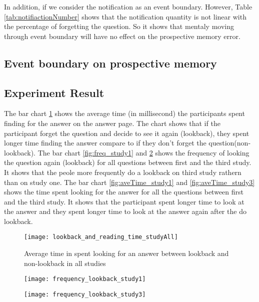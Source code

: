 In addition, if we consider the notification as an event boundary. However, Table \ref{tab:notifiactionNumber} shows
that the notification quantity is not linear with the percentage of forgetting the question.
So it shows that mentaly moving through event boundary will have no effect on the prospective memory error.

\subsection{Event boundary on prospective memory}
\subsection{Experiment Result}
The bar chart \ref{fig:lookingAnswer_lookback} shows the average time (in millisecond) the participants spent finding for the answer on the answer page.
The chart shows that if the participant forget the question and decide to see it again (lookback), they spent longer time finding the answer compare to if they don't forget the question(non-lookback).
The bar chart \ref{fig:freq_study1} and \ref{fig:freq_study3} shows the frequency of looking the question again (lookback) for all questions  between first and the third study.
It shows that the peole more frequently do a lookback on third study rathern than on study one.
The bar chart \ref{fig:aveTime_study1} and \ref{fig:aveTime_study3} shows the time spent looking for the answer for all the questions between first and the third study.
It shows that the participant spent longer time to look at the answer and they spent longer time to look at the answer again after the do lookback.
\begin{figure}[!h]
\begin{center}
\texttt{[image: lookback\_and\_reading\_time\_studyAll]}
\end{center}
\captionsetup{justification=centering}
\caption{Average time in spent looking for an answer between lookback and non-lookback in all studies}
\label{fig:lookingAnswer_lookback}
\end{figure}

\begin{figure}[!h]
\centering
\begin{minipage}{.5\textwidth}
  \centering
  \texttt{[image: frequency\_lookback\_study1]}
  \captionsetup{justification=centering}
  \label{fig:freq_study1}
\end{minipage}%
\begin{minipage}{.5\textwidth}
  \centering
  \texttt{[image: frequency\_lookback\_study3]}
  \captionsetup{justification=centering}
  \label{fig:freq_study3}
\end{minipage}
\end{figure}

